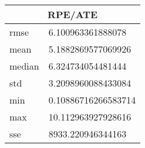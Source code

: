 \begin{table}[!ht] 
 \centering 
 \begin{tabular}{|l|l|} \hline 
 \multicolumn{2}{|c|}{RPE/ATE} \\ \hline 
 rmse & 6.100963361888078 \\ \hline 
mean & 5.1882869577069926 \\ \hline 
median & 6.324734054481444 \\ \hline 
std & 3.2098960088433084 \\ \hline 
min & 0.10886716266583714 \\ \hline 
max & 10.112963927928616 \\ \hline 
sse & 8933.220946344163 \\ \hline 
\end{tabular} 
 \end{table}